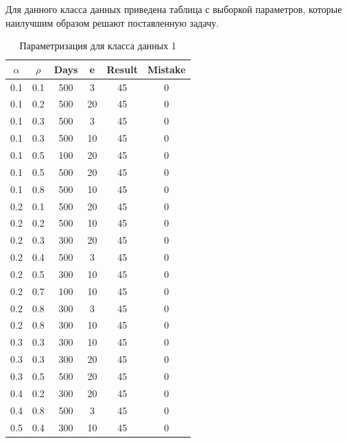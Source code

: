 Для данного класса данных приведена таблица с выборкой параметров, которые наилучшим образом решают поставленную задачу.

\begin{center}
    \captionsetup{justification=raggedright,singlelinecheck=off}
    \begin{longtable}[c]{|c|c|c|c|c|c|}
    \caption{Параметризация для класса данных 1\label{tbl:table_kd1}} 
    	\\ \hline
        $\alpha$ & $\rho$ & Days & e & Result & Mistake \\ \hline
        0.1 &  0.1 &  500 &    3 &    45 & 0 \\ \hline
        0.1 &  0.2 &  500 &   20 &    45 &     0 \\ \hline
        0.1 &  0.3 &  500 &    3 &    45 &     0 \\ \hline
        0.1 &  0.3 &  500 &   10 &    45 &     0 \\ \hline
        0.1 &  0.5 &  100 &   20 &    45 &     0 \\ \hline
        0.1 &  0.5 &  500 &   20 &    45 &     0 \\ \hline
        0.1 &  0.8 &  500 &   10 &    45 &     0 \\ \hline
        0.2 &  0.1 &  500 &   20 &    45 &     0 \\ \hline
        0.2 &  0.2 &  500 &   10 &    45 &     0 \\ \hline
        0.2 &  0.3 &  300 &   20 &    45 &     0 \\ \hline
        0.2 &  0.4 &  500 &    3 &    45 &     0 \\ \hline
        0.2 &  0.5 &  300 &   10 &    45 &     0 \\ \hline
        0.2 &  0.7 &  100 &   10 &    45 &     0 \\ \hline
        0.2 &  0.8 &  300 &    3 &    45 &     0 \\ \hline
        0.2 &  0.8 &  300 &   10 &    45 &     0 \\ \hline
        0.3 &  0.3 &  300 &   10 &    45 &     0 \\ \hline
        0.3 &  0.3 &  300 &   20 &    45 &     0 \\ \hline
        0.3 &  0.5 &  500 &   20 &    45 &     0 \\ \hline
        0.4 &  0.2 &  300 &   20 &    45 &     0 \\ \hline
        0.4 &  0.8 &  500 &    3 &    45 &     0 \\ \hline
        0.5 &  0.4 &  300 &   10 &    45 &     0 \\ \hline

\end{longtable}
\end{center}
